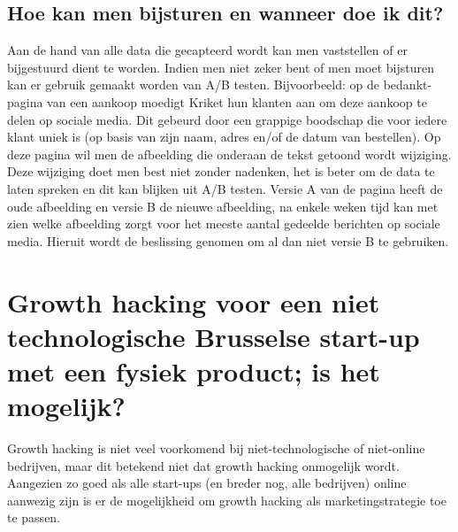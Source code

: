 \subsection{Hoe kan men bijsturen en wanneer doe ik dit?}
\label{subsec:growth-hack-bijsturen}
Aan de hand van alle data die gecapteerd wordt kan men vaststellen of er bijgestuurd dient te worden. Indien men niet zeker bent of men moet bijsturen kan er gebruik gemaakt worden van A/B testen. Bijvoorbeeld: op de bedankt-pagina van een aankoop moedigt Kriket hun klanten aan om deze aankoop te delen op sociale media. Dit gebeurd door een grappige boodschap die voor iedere klant uniek is (op basis van zijn naam, adres en/of de datum van bestellen). Op deze pagina wil men de afbeelding die onderaan de tekst getoond wordt wijziging. Deze wijziging doet men best niet zonder nadenken, het is beter om de data te laten spreken en dit kan blijken uit A/B testen. Versie A van de pagina heeft de oude afbeelding en versie B de nieuwe afbeelding, na enkele weken tijd kan met zien welke afbeelding zorgt voor het meeste aantal gedeelde berichten op sociale media. Hieruit wordt de beslissing genomen om al dan niet versie B te gebruiken.

 
\section{Growth hacking voor een niet technologische Brusselse start-up met een fysiek product; is het mogelijk?}
\label{sec:growth-hacking-mogelijk}
Growth hacking is niet veel voorkomend bij niet-technologische of niet-online bedrijven, maar dit betekend niet dat growth hacking onmogelijk wordt. Aangezien zo goed als alle start-ups (en breder nog, alle bedrijven) online aanwezig zijn is er de mogelijkheid om growth hacking als marketingstrategie toe te passen. 